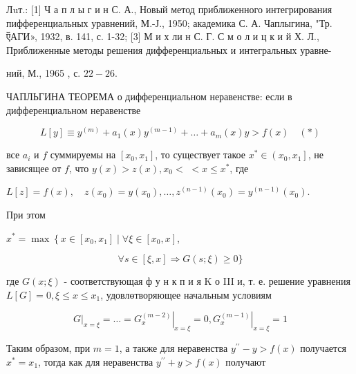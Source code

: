 \documentclass[10pt]{article}
\begin{document}
Лuт.: [1] Ч а п л ы г и н С. А., Новый метод приближенного интегрирования пифференциальных уравнений, М.-Ј., 1950; академика С. А. Чаплыгина, "Тр. ऍАГИ», 1932, в. 141, с. 1-32; [3] М и х ли н С. Г. С м о л и ц к и й Х. Л., Приближенные методы решения дифференциальных и интегральных уравне-

ний, М., 1965 , с. $22-26$.



ЧАПЛЬГИНА ТЕОРЕМА о дифференциальном неравенстве: если в дифференциальном неравенстве



\[

L[y] \equiv y^{(m)}+a_{1}(x) y^{(m-1)}+\ldots+a_{m}(x) y>f(x) \quad(*)

\]



все $a_{i}$ и $f$ суммируемы на $\left[x_{0}, x_{1}\right]$, то существует такое $x^{*} \in\left(x_{0}, x_{1}\right]$, не зависящее от $f$, что $y(x)>z(x), x_{0}<$ $<x \leqslant x^{*}$, где



$L[z]=f(x), \quad z\left(x_{0}\right)=y\left(x_{0}\right), \ldots, z^{(n-1)}\left(x_{0}\right)=y^{(n-1)}\left(x_{0}\right)$.



При этом



$x^{*}=\max \left\{x \in\left[x_{0}, x_{1}\right] \mid \forall \xi \in\left[x_{0}, x\right]\right.$,



\[

\forall s \in[\xi, x] \Rightarrow G(s ; \xi) \geqslant 0\}

\]



где $G(x ; \xi)$ - соответствующая ф у н к п и я $\mathrm{K}$ о III и, т. е. решение уравнения $L[G]=0, \xi \leqslant x \leqslant x_{1}$, удовлөтворяющее начальным условиям



\[

\left.G\right|_{x=\xi}=\ldots=\left.G_{x}^{(m-2)}\right|_{x=\xi}=0,\left.G_{x}^{(m-1)}\right|_{x=\xi}=1

\]



Таким образом, при $m=1$, а также для неравенства $y^{\prime \prime}-y>f(x)$ получается $x^{*}=x_{1}$, тогда как для неравенства $y^{\prime \prime}+y>f(x)$ получают
\end{document}
